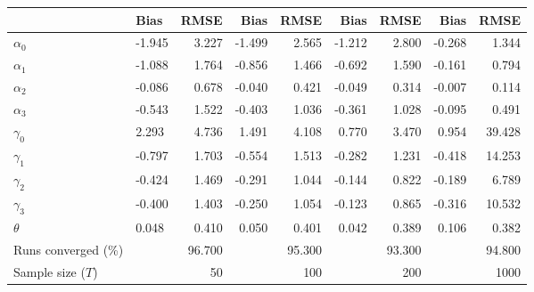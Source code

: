 
\begin{tabular}[t]{llrrrrrrr}
\toprule
  & Bias & RMSE & Bias & RMSE & Bias & RMSE & Bias & RMSE\\
\midrule
$\alpha_{0}$ & -1.945 & 3.227 & -1.499 & 2.565 & -1.212 & 2.800 & -0.268 & 1.344\\
$\alpha_{1}$ & -1.088 & 1.764 & -0.856 & 1.466 & -0.692 & 1.590 & -0.161 & 0.794\\
$\alpha_{2}$ & -0.086 & 0.678 & -0.040 & 0.421 & -0.049 & 0.314 & -0.007 & 0.114\\
$\alpha_{3}$ & -0.543 & 1.522 & -0.403 & 1.036 & -0.361 & 1.028 & -0.095 & 0.491\\
$\gamma_{0}$ & 2.293 & 4.736 & 1.491 & 4.108 & 0.770 & 3.470 & 0.954 & 39.428\\
$\gamma_{1}$ & -0.797 & 1.703 & -0.554 & 1.513 & -0.282 & 1.231 & -0.418 & 14.253\\
$\gamma_{2}$ & -0.424 & 1.469 & -0.291 & 1.044 & -0.144 & 0.822 & -0.189 & 6.789\\
$\gamma_{3}$ & -0.400 & 1.403 & -0.250 & 1.054 & -0.123 & 0.865 & -0.316 & 10.532\\
$\theta$ & 0.048 & 0.410 & 0.050 & 0.401 & 0.042 & 0.389 & 0.106 & 0.382\\
Runs converged (\%) &  & 96.700 &  & 95.300 &  & 93.300 &  & 94.800\\
Sample size ($T$) &  & 50 &  & 100 &  & 200 &  & 1000\\
\bottomrule
\end{tabular}
